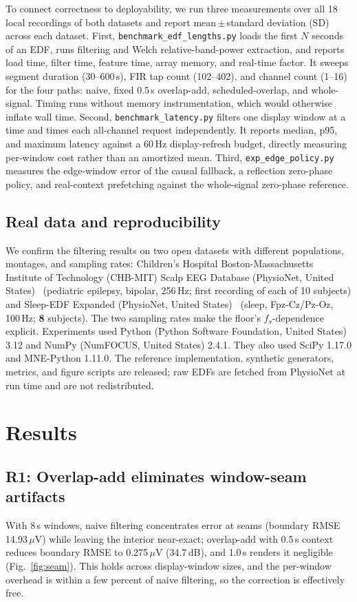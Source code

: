 \documentclass[conference]{IEEEtranSPMB}
\begin{document}
To connect correctness to deployability, we run three measurements over all 18 local recordings of
both datasets and report mean\,$\pm$\,standard deviation (SD) across each dataset. First,
\texttt{benchmark\_edf\_lengths.py} loads the first $N$ seconds of an EDF, runs filtering and
Welch relative-band-power extraction, and reports load time, filter time, feature time, array
memory, and real-time factor. It sweeps segment duration (30--600\,s), FIR tap count (102--402), and
channel count (1--16) for the four paths: naive, fixed 0.5\,s overlap-add, scheduled-overlap, and
whole-signal. Timing runs without memory instrumentation, which would otherwise inflate wall time.
Second, \texttt{benchmark\_latency.py} filters one display window at a time and times each
all-channel request independently. It reports median, p95, and maximum latency against a 60\,Hz
display-refresh budget, directly measuring per-window cost rather than an amortized mean. Third,
\texttt{exp\_edge\_policy.py} measures the edge-window error of the causal fallback, a reflection
zero-phase policy, and real-context prefetching against the whole-signal zero-phase reference.

\subsection{Real data and reproducibility}
We confirm the filtering results on two open datasets with different populations, montages, and
sampling rates: Children's Hospital Boston-Massachusetts Institute of Technology
(CHB-MIT) Scalp EEG Database (PhysioNet, United States)~\cite{guttag2010chbmit,shoeb2009,goldberger2000}
(pediatric epilepsy, bipolar, 256\,Hz; first recording of each of 10 subjects) and Sleep-EDF
Expanded (PhysioNet, United States)~\cite{kemp2000sleepedf,sleepedfx2013,goldberger2000}
(sleep, Fpz-Cz/Pz-Oz, 100\,Hz; \textbf{8} subjects). The two sampling rates
make the floor's $f_s$-dependence explicit. Experiments used Python (Python Software Foundation,
United States) 3.12 and NumPy (NumFOCUS, United States) 2.4.1. They also used SciPy 1.17.0 and
MNE-Python 1.11.0. The reference
implementation, synthetic generators, metrics, and figure scripts are released; raw EDFs are
fetched from PhysioNet at run time and are not redistributed.

\section{Results}
\subsection{R1: Overlap-add eliminates window-seam artifacts}
With 8\,s windows, naive filtering concentrates error at seams (boundary RMSE 14.93\,$\mu$V) while
leaving the interior near-exact; overlap-add with 0.5\,s context reduces boundary RMSE to
0.275\,$\mu$V (34.7\,dB), and 1.0\,s renders it negligible (Fig.~\ref{fig:seam}). This holds across
display-window sizes, and the per-window overhead is within a few percent of naive filtering, so
the correction is effectively free.
\end{document}
